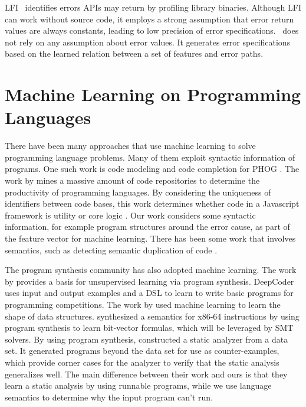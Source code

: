 \documentclass[12pt]{report}	%
\begin{document}
LFI~\cite{marinescu2011efficient} identifies errors APIs may return
by profiling library binaries.
Although LFI can work without source code,
it employs a strong assumption that error return values are always constants,
leading to low precision of error specifications.
\newTool\ does not rely on any assumption about error values.
It generates error specifications based on the learned relation between a set of features and error paths.

\section{Machine Learning on Programming Languages}

There have been many approaches that use machine learning to solve
programming language problems. Many of them exploit syntactic
information of programs. One such work is code modeling and code completion
for PHOG \cite{Bielik2016:PPM}.
The work by \cite{Allamanis:2013:MSC:2487085.2487127}
mines a massive amount of code
repositories to determine the productivity of programming languages.
By considering the
uniqueness of identifiers between code bases, this work
determines whether code in a Javascript framework is
utility or core logic \cite{Allamanis:2013:MSC:2487085.2487127}.
Our work considers some syntactic information, for example
program structures around the error cause, as part of the feature
vector for machine learning.
%
There has been
some work that involves semantics, such as detecting semantic
duplication of code \cite{Sheneamer:2016:SCD}.

The program synthesis community has also adopted machine learning.
The work by \cite{Ellis:2015:ULP:2969239.2969348} provides a basis for
unsupervised learning via program synthesis.
DeepCoder \cite{DBLP:journals/corr/BalogGBNT16} uses input and output
examples and a DSL to learn to write
basic programs for programming competitions.
The work by \cite{Zhu16:ALSS} used machine learning to learn
the shape of data structures. \cite{Heule:2016:SSA:2980983.2908121}
synthesized a semantics for x86-64 instructions by using program
synthesis to learn bit-vector formulas, which will be leveraged
by SMT solvers.
%
By using program synthesis, \cite{Bielik16:LSAD} constructed a static
analyzer from a data set.
It generated programs beyond the data set for use as counter-examples,
which provide corner cases for the analyzer to verify that the
static analysis generalizes well.
The main difference between their work
and ours is that they learn a static analysis by
using runnable programs, while we use language semantics
to determine why the input program can't run.
\end{document}
